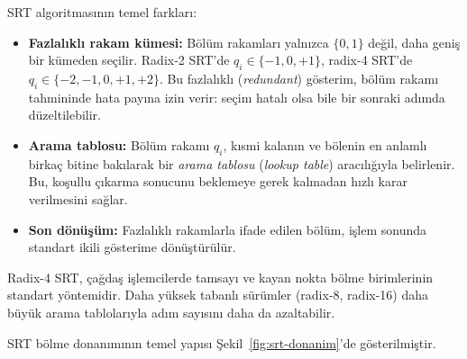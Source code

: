 SRT algoritmasının temel farkları:
\begin{itemize}[nosep]
    \item \textbf{Fazlalıklı rakam kümesi:} Bölüm rakamları yalnızca $\{0, 1\}$ değil, daha geniş bir kümeden seçilir. Radix-2 SRT'de $q_i \in \{-1, 0, +1\}$, radix-4 SRT'de $q_i \in \{-2, -1, 0, +1, +2\}$. Bu fazlalıklı (\emph{redundant}) gösterim, bölüm rakamı tahmininde hata payına izin verir: seçim hatalı olsa bile bir sonraki adımda düzeltilebilir.
    \item \textbf{Arama tablosu:} Bölüm rakamı $q_i$, kısmi kalanın ve bölenin en anlamlı birkaç bitine bakılarak bir \emph{arama tablosu} (\emph{lookup table}) aracılığıyla belirlenir. Bu, koşullu çıkarma sonucunu beklemeye gerek kalmadan hızlı karar verilmesini sağlar.
    \item \textbf{Son dönüşüm:} Fazlalıklı rakamlarla ifade edilen bölüm, işlem sonunda standart ikili gösterime dönüştürülür.
\end{itemize}

Radix-4 SRT, çağdaş işlemcilerde tamsayı ve kayan nokta bölme birimlerinin standart yöntemidir. Daha yüksek tabanlı sürümler (radix-8, radix-16) daha büyük arama tablolarıyla adım sayısını daha da azaltabilir.

SRT bölme donanımının temel yapısı Şekil~\ref{fig:srt-donanim}'de gösterilmiştir.

